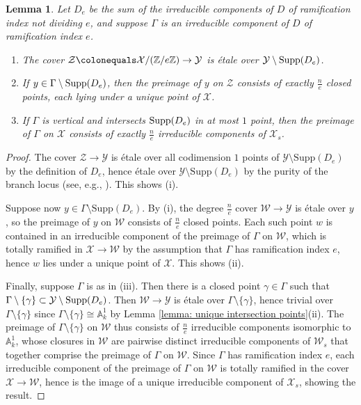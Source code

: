 \documentclass[12pt]{amsart}
\numberwithin{equation}{section}
\newtheorem{lemma}[equation]{Lemma}
\theoremstyle{definition}
\newcommand{\Z}{\mathbb Z}
\newcommand{\A}{\mathbb A}
\newcommand{\W}{\mathcal{W}}
\newcommand{\X}{\mathcal{X}}
\newcommand{\Y}{\mathcal{Y}}
\newcommand{\tx}[1]{\text{#1}}
\begin{document}
\begin{lemma}\label{lemma: etale} Let $D_e$ be the sum of the irreducible components of $D$ of ramification index not dividing $e$, and suppose $\Gamma$ is an irreducible component of $D$ of ramification index $e$.
    \begin{enumerate}[\upshape (i)]
        \item The cover $\mathcal{Z}\colonequals\X/(\Z/e\Z)\to\Y$ is \'{e}tale over $\Y\setminus\textup{Supp}(D_e)$.
        \item If $y\in\Gamma\setminus\textup{Supp}(D_e)$, then the preimage of $y$ on $\mathcal{Z}$ consists of exactly $\frac{n}{e}$ closed points, each lying under a unique point of $\X$.
        \item If $\Gamma$ is vertical and intersects $\textup{Supp}(D_e)$ in at most $1$ point, then the preimage of $\Gamma$ on $\X$ consists of exactly $\frac{n}{e}$ irreducible components of $\X_s$.
    \end{enumerate}
\end{lemma}
\begin{proof}
    The cover $\mathcal{Z}\to\Y$ is \'{e}tale over all codimension $1$ points of $\Y\setminus\tx{Supp}(D_e)$ by the definition of $D_e$, hence \'{e}tale over $\Y\setminus\tx{Supp}(D_e)$ by the purity of the branch locus (see, e.g., \cite[Theorem 5.2.13]{Szamuely}). This shows (i).

    Suppose now $y\in\Gamma\setminus\tx{Supp}(D_e)$. By (i), the degree $\frac{n}{e}$ cover $\W\to\Y$ is \'{e}tale over $y$, so the preimage of $y$ on $\W$ consists of $\frac{n}{e}$ closed points. Each such point $w$ is contained in an irreducible component of the preimage of $\Gamma$ on $\W$, which is totally ramified in $\X\to\W$ by the assumption that $\Gamma$ has ramification index $e$, hence $w$ lies under a unique point of $\X$. This shows (ii).
    
    Finally, suppose $\Gamma$ is as in (iii). Then there is a closed point $\gamma\in\Gamma$ such that $\Gamma\setminus\{\gamma\}\subset\Y\setminus\textup{Supp}(D_e)$. Then $\W\to\Y$ is \'{e}tale over $\Gamma\setminus\{\gamma\}$, hence trivial over $\Gamma\setminus\{\gamma\}$ since $\Gamma\setminus\{\gamma\}\cong\A^1_k$ by Lemma \ref{lemma: unique intersection points}(ii). The preimage of $\Gamma\setminus\{\gamma\}$ on $\W$ thus consists of $\frac{n}{e}$ irreducible components isomorphic to $\A^1_k$, whose closures in $\W$ are pairwise distinct irreducible components of $\W_s$ that together comprise the preimage of $\Gamma$ on $\W$. Since $\Gamma$ has ramification index $e$, each irreducible component of the preimage of $\Gamma$ on $\W$ is totally ramified in the cover $\X\to\W$, hence is the image of a unique irreducible component of $\X_s$, showing the result.
\end{proof}
\end{document}
